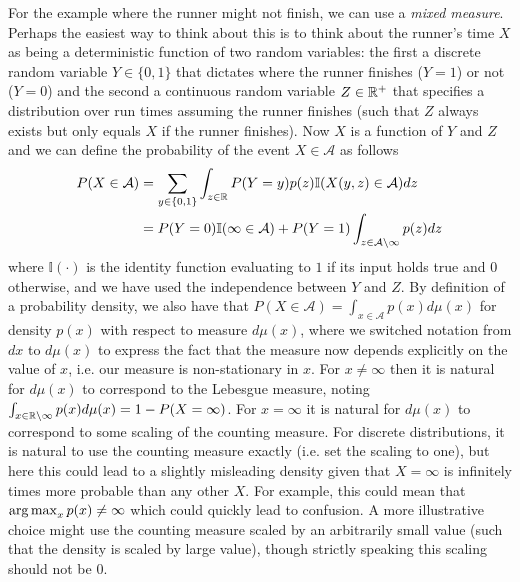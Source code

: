 For the example where the runner might not finish, we can
use a \emph{mixed measure}.  Perhaps the easiest way to think about this is to think about
the runner's time $X$ as being a deterministic function of two random variables: the first
a discrete random variable $Y\in\{0,1\}$ that dictates where the runner finishes ($Y=1$) or not ($Y=0$) and the second 
a continuous random variable $Z\in\mathbb{R}^+$ that specifies a distribution over run times assuming the
runner finishes (such that $Z$ always exists but only equals $X$ if the runner finishes).  
Now $X$ is a function of $Y$ and $Z$ and we can define the probability of the event
$X\in \mathcal{A}$ as follows
\begin{align*}
P(X \in \mathcal{A}) &= \sum_{y \in \{0,1\}} \int_{z\in \mathbb{R}} P(Y=y) p(z) \mathbb{I}(X(y,z) \in \mathcal{A}) dz \\
&= P(Y=0) \mathbb{I}(\infty\in \mathcal{A})  + P(Y=1) \int_{z\in \mathcal{A}\backslash\infty} p(z) dz
\end{align*}
where $\mathbb{I}(\cdot)$ is the identity function evaluating to $1$ if its
input holds true and $0$ otherwise, and we have used the independence between 
$Y$ and $Z$.  By definition of a probability density, we also
have that $P(X \in \mathcal{A}) = \int_{x\in\mathcal{A}} p(x) d\mu(x)$ for density $p(x)$
with respect to measure $d\mu(x)$, where we switched notation from $dx$ to $d\mu(x)$ to express
the fact that the measure now depends explicitly on the value of $x$, i.e. our measure
is non-stationary in $x$.  For $x\neq\infty$ then it is natural for $d\mu(x)$ to correspond to the
Lebesgue measure, noting $\int_{x\in \mathbb{R}\backslash\infty} p(x) d\mu(x) = 1-P(X=\infty)$.
For $x=\infty$ it is natural for $d\mu(x)$ to correspond to some scaling of the counting
measure.  For discrete distributions, it is natural to use the counting measure exactly (i.e. set the
scaling to one), but here this could lead to a slightly misleading density given that $X=\infty$
is infinitely times more probable than any other $X$.  For example, this could mean that
$\operatorname*{arg\,max}_x p(x) \neq \infty$ which could quickly lead to confusion.  A more illustrative
choice might use the counting measure scaled by an arbitrarily small value (such that
the density is scaled by large value), though strictly speaking this scaling should not be $0$.

